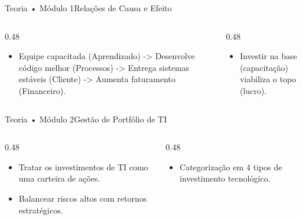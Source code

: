 \begin{senaiframe}{Teoria • Módulo 1}{Relações de Causa e Efeito}
  \begin{columns}[t]
    \begin{column}{0.48\textwidth}
      \begin{tcolorbox}[senaibluecard, title={Encadeamento Lógico}]
        \begin{itemize}
          \item Equipe capacitada (Aprendizado) -> Desenvolve código melhor (Processos) -> Entrega sistemas estáveis (Cliente) -> Aumenta faturamento (Financeiro).
        \end{itemize}
      \end{tcolorbox}
    \end{column}
    \begin{column}{0.48\textwidth}
      \begin{tcolorbox}[senaicard, title={Importância da Base}]
        \begin{itemize}
          \item Investir na base (capacitação) viabiliza o topo (lucro).
        \end{itemize}
      \end{tcolorbox}
    \end{column}
  \end{columns}
\end{senaiframe}

\begin{senaiframe}{Teoria • Módulo 2}{Gestão de Portfólio de TI}
  \begin{columns}[t]
    \begin{column}{0.48\textwidth}
      \begin{tcolorbox}[senaibluecard, title={Equilíbrio de Ativos}]
        \begin{itemize}
          \item Tratar os investimentos de TI como uma carteira de ações.
          \item Balancear riscos altos com retornos estratégicos.
        \end{itemize}
      \end{tcolorbox}
    \end{column}
    \begin{column}{0.48\textwidth}
      \begin{tcolorbox}[senaiambercard, title={Weill \& Aral}]
        \begin{itemize}
          \item Categorização em 4 tipos de investimento tecnológico.
        \end{itemize}
      \end{tcolorbox}
    \end{column}
  \end{columns}
\end{senaiframe}

